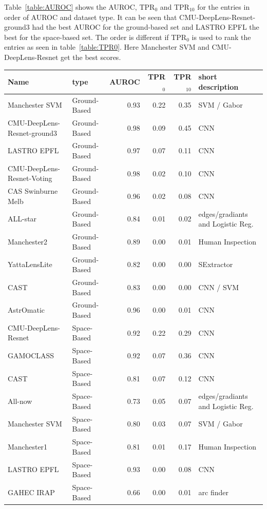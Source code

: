 \documentclass{aa}
\begin{document}
Table~\ref{table:AUROC} shows the AUROC, TPR$_0$ and TPR$_{10}$ for the entries in order of AUROC and dataset type.  It can be seen that CMU-DeepLens-Resnet-ground3 had the best AUROC for the ground-based set and LASTRO EPFL the best for the space-based set.  The order is different if TPR$_0$ is used to rank the entries as seen in table~\ref{table:TPR0}.  Here Manchester SVM and 
CMU-DeepLens-Resnet get the best scores.

\begin{table}
\centering
\begin{tabular}{llrrrl}
  \hline
  Name & type & AUROC & TPR$_0$ & TPR$_{10}$ & short description \\ 
  \hline
 Manchester SVM & Ground-Based & 0.93 & 0.22 & 0.35 & SVM / Gabor \\ 
  CMU-DeepLens-Resnet-ground3 & Ground-Based & 0.98 & 0.09 & 0.45 & CNN \\ 
  LASTRO EPFL & Ground-Based & 0.97 & 0.07 & 0.11 & CNN \\ 
   CMU-DeepLens-Resnet-Voting & Ground-Based & 0.98 & 0.02 & 0.10 & CNN \\ 
   CAS Swinburne Melb & Ground-Based & 0.96 & 0.02 & 0.08 & CNN \\ 
   ALL-star & Ground-Based & 0.84 & 0.01 & 0.02 & edges/gradiants and Logistic Reg. \\ 
   Manchester2 & Ground-Based & 0.89 & 0.00 & 0.01 & Human Inspection \\ 
   YattaLensLite & Ground-Based & 0.82 & 0.00 & 0.00 & SExtractor \\ 
   CAST & Ground-Based & 0.83 & 0.00 & 0.00 & CNN / SVM \\ 
   AstrOmatic & Ground-Based & 0.96 & 0.00 & 0.01 & CNN \\ 
   CMU-DeepLens-Resnet & Space-Based & 0.92 & 0.22 & 0.29 & CNN \\ 
   GAMOCLASS & Space-Based & 0.92 & 0.07 & 0.36 & CNN \\ 
   CAST & Space-Based & 0.81 & 0.07 & 0.12 & CNN \\ 
   All-now & Space-Based & 0.73 & 0.05 & 0.07 & edges/gradiants and Logistic Reg. \\ 
   Manchester SVM & Space-Based & 0.80 & 0.03 & 0.07 & SVM / Gabor \\ 
   Manchester1 & Space-Based & 0.81 & 0.01 & 0.17 & Human Inspection \\ 
   LASTRO EPFL & Space-Based & 0.93 & 0.00 & 0.08 & CNN \\ 
   GAHEC IRAP & Space-Based & 0.66 & 0.00 & 0.01 & arc finder \\ 

\end{tabular}
\end{table}
\end{document}
